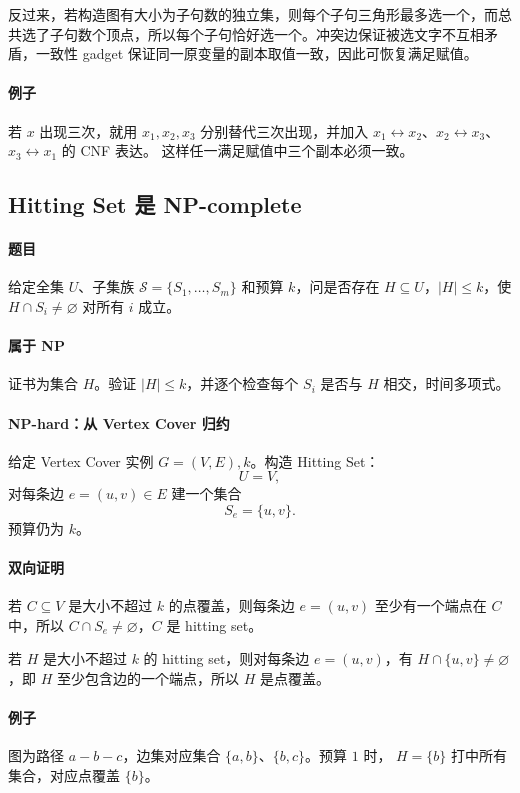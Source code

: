 \documentclass[UTF8,openany,12pt]{ctexbook}
\theoremstyle{remark}
\begin{document}
反过来，若构造图有大小为子句数的独立集，则每个子句三角形最多选一个，而总共选了子句数个顶点，所以每个子句恰好选一个。冲突边保证被选文字不互相矛盾，一致性 gadget 保证同一原变量的副本取值一致，因此可恢复满足赋值。

\paragraph{例子}
若 $x$ 出现三次，就用 $x_1,x_2,x_3$ 分别替代三次出现，并加入
$x_1\leftrightarrow x_2$、$x_2\leftrightarrow x_3$、$x_3\leftrightarrow x_1$ 的 CNF 表达。
这样任一满足赋值中三个副本必须一致。

\subsection{Hitting Set 是 NP-complete}

\paragraph{题目}
给定全集 $U$、子集族 $\mathcal S=\{S_1,\dots,S_m\}$ 和预算 $k$，问是否存在
$H\subseteq U$，$|H|\le k$，使 $H\cap S_i\ne\varnothing$ 对所有 $i$ 成立。

\paragraph{属于 NP}
证书为集合 $H$。验证 $|H|\le k$，并逐个检查每个 $S_i$ 是否与 $H$ 相交，时间多项式。

\paragraph{NP-hard：从 Vertex Cover 归约}
给定 Vertex Cover 实例 $G=(V,E),k$。构造 Hitting Set：
\[
  U=V,
\]
对每条边 $e=(u,v)\in E$ 建一个集合
\[
  S_e=\{u,v\}.
\]
预算仍为 $k$。

\paragraph{双向证明}
若 $C\subseteq V$ 是大小不超过 $k$ 的点覆盖，则每条边 $e=(u,v)$ 至少有一个端点在
$C$ 中，所以 $C\cap S_e\ne\varnothing$，$C$ 是 hitting set。

若 $H$ 是大小不超过 $k$ 的 hitting set，则对每条边 $e=(u,v)$，有
$H\cap\{u,v\}\ne\varnothing$，即 $H$ 至少包含边的一个端点，所以 $H$ 是点覆盖。

\paragraph{例子}
图为路径 $a-b-c$，边集对应集合 $\{a,b\}$、$\{b,c\}$。预算 $1$ 时，
$H=\{b\}$ 打中所有集合，对应点覆盖 $\{b\}$。
\end{document}
